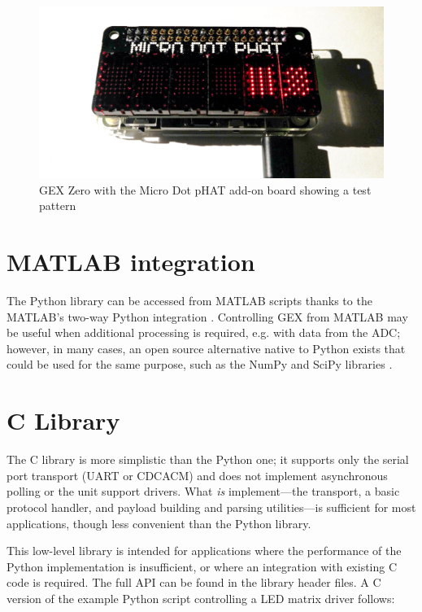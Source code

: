 \begin{figure}[h]
	\centering
	\includegraphics[width=.7\textwidth] {img/phatmtx.jpg}
	\caption{\label{fig:pydemo}GEX Zero with the Micro Dot pHAT add-on board showing a test pattern}
\end{figure}

\section{MATLAB integration}

The Python library can be accessed from MATLAB scripts thanks to the MATLAB's two-way Python integration \cite{matlabpy}. Controlling GEX from MATLAB may be useful when additional processing is required, e.g. with data from the \gls{ADC}; however, in many cases, an open source alternative native to Python exists that could be used for the same purpose, such as the NumPy and SciPy libraries \cite{numpyscipy}.


\section{C Library}

The C library is more simplistic than the Python one; it supports only the serial port transport (\gls{UART} or \gls{CDCACM}) and does not implement asynchronous polling or the unit support drivers. What \textit{is} implement---the transport, a basic protocol handler, and payload building and parsing utilities---is sufficient for most applications, though less convenient than the Python library. 

This low-level library is intended for applications where the performance of the Python implementation is insufficient, or where an integration with existing C code is required. The full \gls{API} can be found in the library header files. A C version of the example Python script controlling a \gls{LED} matrix driver follows:








